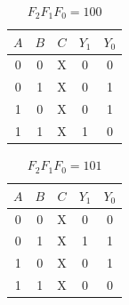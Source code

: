 \documentclass[11pt, a4paper]{article}
\begin{document}
\medskip

\begin{minipage}[t]{0.48\textwidth}
\begin{table}[H]
    \centering
    \caption{$F_2 F_1 F_0 = 100$}
    \begin{tabular}{|ccc|cc|} %
        \hline
        $A$ & $B$ & $C$ & $Y_1$ & $Y_0$ \\
        \hline
        0 & 0 & X & 0 & 0 \\
        \hline
        0 & 1 & X & 0 & 1 \\
        \hline
        1 & 0 & X & 0 & 1 \\
        \hline
        1 & 1 & X & 1 & 0 \\
        \hline
    \end{tabular}
\end{table}
\end{minipage}
\hfill
\begin{minipage}[t]{0.48\textwidth}
\begin{table}[H]
    \centering
    \caption{$F_2 F_1 F_0 = 101$}
    \begin{tabular}{|ccc|cc|} %
        \hline
        $A$ & $B$ & $C$ & $Y_1$ & $Y_0$ \\
        \hline
        0 & 0 & X & 0 & 0 \\
        \hline
        0 & 1 & X & 1 & 1 \\
        \hline
        1 & 0 & X & 0 & 1 \\
        \hline
        1 & 1 & X & 0 & 0 \\
        \hline
    \end{tabular}
\end{table}
\end{minipage}

\medskip
\end{document}
